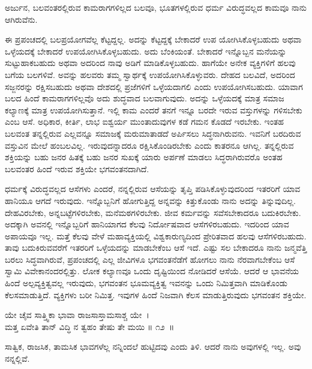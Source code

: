 \begin{artha}
ಅರ್ಜುನ, ಬಲವಂತರಲ್ಲಿರುವ ಕಾಮರಾಗಗಳಿಲ್ಲದ ಬಲವೂ, ಭೂತಗಳಲ್ಲಿರುವ ಧರ್ಮ ವಿರುದ್ಧ\-ವಲ್ಲದ ಕಾಮವೂ ನಾನು ಆಗಿರುವೆನು.
\end{artha}

ಈ ಪ್ರಪಂಚದಲ್ಲಿ ಬಲಪ್ರಯೋಗವೆಲ್ಲ ಕೆಟ್ಟದ್ದಲ್ಲ. ಅದನ್ನು ಕೆಟ್ಟದ್ದಕ್ಕೆ ಬೇಕಾದರೆ ಉಪ ಯೋಗಿಸಿಕೊಳ್ಳಬಹುದು ಅಥವಾ ಒಳ್ಳೆಯದಕ್ಕೆ ಬೇಕಾದರೆ ಉಪಯೋಗಿಸಿಕೊಳ್ಳಬಹುದು. ಅದು ಬೆಂಕಿಯಂತೆ. ಬೇಕಾದರೆ ಇನ್ನೊಬ್ಬನ ಮನೆಯನ್ನು ಸುಟ್ಟುಹಾಕಬಹುದು ಅಥವಾ ಅದರಿಂದ ನಾವು ಅಡಿಗೆ ಮಾಡಿಕೊಳ್ಳಬಹುದು. ಹಾಗೆಯೇ ಅನೇಕ ವ್ಯಕ್ತಿಗಳಿಗೆ ಹಲವು ಬಗೆಯ ಬಲಗಳಿವೆ. ಅವನ್ನು ಹಲವರು ತಮ್ಮ ಸ್ವಾರ್ಥಕ್ಕೆ ಉಪಯೋಗಿಸಿಕೊಳ್ಳುವರು. ದೇಹದ ಬಲವಿದೆ, ಅದರಿಂದ ಸಜ್ಜನರನ್ನು ರಕ್ಷಿಸಬಹುದು ಅಥವಾ ದೇಶದಲ್ಲಿ ಪ್ರಜೆಗಳಿಗೆ ಒಳ್ಳೆಯದಾಗಲಿ ಎಂದು ಉಪಯೋಗಿಸಬಹುದು. ಯಾವಾಗ ಬಲದ ಹಿಂದೆ ಕಾಮರಾಗಗಳಿಲ್ಲವೊ ಅದು ಶುದ್ಧವಾದ ಬಲವಾಗುವುದು. ಅದನ್ನು ಒಳ್ಳೆಯದಕ್ಕೆ ಮಾತ್ರ ಸಮಾಜ ಕಲ್ಯಾಣಕ್ಕೆ ಮಾತ್ರ ಉಪಯೋಗಿಸುತ್ತಾನೆ. ಇಲ್ಲಿ ಕಾಮ ಎಂದರೆ ತನಗೆ ಇನ್ನೂ ಬರದೇ ಇರುವ ವಸ್ತುಗಳನ್ನು ಗಳಿಸಬೇಕು ಎಂಬ ಆಸೆ. ಅಧಿಕಾರ, ಕೀರ್ತಿ, ಲಾಭ ಐಶ್ವರ್ಯ ಮುಂತಾದುವುಗಳ ಕಡೆ ಗಮನ ಕೊಡದೆ ಇರಬೇಕು. ಇಂತಹ ಬಲವಂತ ತನ್ನಲ್ಲಿರುವ ಎಲ್ಲವನ್ನೂ ಸಮಾಜಕ್ಕೆ ಮರುಮಾತಾಡದೆ ಅರ್ಪಿಸಲು ಸಿದ್ಧನಾಗಿರುವನು. ಇವನಿಗೆ ಬರದಿರುವ ವಸ್ತುವಿನ ಮೇಲೆ ಹಂಬಲವಿಲ್ಲ. ಇರುವುದನ್ನಾದರೂ ರಕ್ಷಿಸಿಕೊಂಡಿರಬೇಕು ಎಂದು ಕಾತರನೂ ಆಗಿಲ್ಲ. ತನ್ನಲ್ಲಿರುವ ಶಕ್ತಿಯನ್ನು ಬಹು ಜನರ ಹಿತಕ್ಕೆ ಬಹು ಜನರ ಸುಖಕ್ಕೆ ಯಾರು ಅರ್ಪಣೆ ಮಾಡಲು ಸಿದ್ಧರಾಗಿರುವರೊ ಅಂತಹ ಬಲವಂತರ ಹಿಂದೆ ಇರುವ ಶಕ್ತಿಯೇ ಭಗವಂತನದಾಗಿದೆ.

ಧರ್ಮಕ್ಕೆ ವಿರುದ್ಧವಲ್ಲದ ಆಸೆಗಳು ಎಂದರೆ, ನನ್ನಲ್ಲಿರುವ ಆಸೆಯನ್ನು ತೃಪ್ತಿ ಪಡಿಸಿಕೊಳ್ಳುವುದರಿಂದ ಇತರರಿಗೆ ಯಾವ ಹಾನಿಯೂ ಆಗದೆ ಇರುವುದು. ಇನ್ನೊಬ್ಬನಿಗೆ ಹೋಗುತ್ತಿದ್ದ ಅನ್ನವನ್ನು ಕಿತ್ತುಕೊಂಡು ನಾನು ಅದನ್ನು ತಿನ್ನುವುದಿಲ್ಲ. ದೇಹವಿರಬೇಕು, ಅನ್ನಬಟ್ಟೆಗಳಿರಬೇಕು, ಮನೆಮಠಗಳಿರಬೇಕು. ಜೀವ ಕರ್ಮವನ್ನು ಸವೆಸಬೇಕಾದರೂ ಬದುಕಿರಬೇಕು. ಅದಕ್ಕಾಗಿ ಅವನಲ್ಲಿ ಇನ್ನೊಬ್ಬರಿಗೆ ಹಾನಿಯಾಗದ ಕೆಲವು ನಿರ್ದೋಷವಾದ ಆಸೆಗಳಿರಬಹುದು. ಇದರಿಂದ ಯಾವ ಅಪಾಯವೂ ಇಲ್ಲ. ಮತ್ತೆ ಕೆಲವು ವೇಳೆ ಮಹಾವ್ಯಕ್ತಿಯಲ್ಲಿ ವಿಶ್ವಕಾರುಣ್ಯದಿಂದ ಪ್ರೇರಿತವಾದ ಹಲವು ಆಸೆಗಳಿರಬಹುದು. ತಾವು ಬದುಕಿರುವವರೆಗೆ ಇತರರಿಗೆ ಒಳ್ಳೆಯದನ್ನು ಮಾಡಬೇಕೆಂಬ ಆಸೆ ಇದೆ. ಎಷ್ಟು ಸಲ ಬೇಕಾದರೂ ನಾನು ಜನ್ಮವೆತ್ತಿ ಬರಲು ಸಿದ್ಧವಾಗಿರುವೆ, ಪ್ರಪಂಚದಲ್ಲಿ ಎಲ್ಲ ಜೀವಿಗಳೂ ಭಗವಂತನೆಡೆಗೆ ಹೋಗಲು ನಾನು ನೆರವಾಗಬೇಕೆಂಬ ಆಸೆ ಸ್ವಾಮಿ ವಿವೇಕಾನಂದರಲ್ಲಿತ್ತು. ಲೋಕ ಕಲ್ಯಾಣವೂ ಒಂದು ದೃಷ್ಟಿಯಿಂದ ನೋಡಿದರೆ ಆಸೆಯೆ. ಆದರೆ ಆ ಭಾವನೆಯ ಹಿಂದೆ ಅಲ್ಪವ್ಯಕ್ತಿತ್ವವಲ್ಲ ಇರುವುದು, ಭಗವಂತನ ಭೂಮವ್ಯಕ್ತಿತ್ವ ಇವನನ್ನು ಒಂದು ನಿಮಿತ್ತವಾಗಿ ಮಾಡಿಕೊಂಡು ಕೆಲಸಮಾಡುತ್ತಿದೆ. ವ್ಯಕ್ತಿಗಳು ಬರೀ ನಿಮಿತ್ತ. ಇವುಗಳ ಹಿಂದೆ ನಿಜವಾಗಿ ಕೆಲಸ ಮಾಡುತ್ತಿರುವುದು ಭಗವಂತನ ಶಕ್ತಿಯೇ.

\begin{shloka}
ಯೇ ಚೈವ ಸಾತ್ತ್ವಿಕಾ ಭಾವಾ ರಾಜಸಾಸ್ತಾಮಸಾಶ್ಚ ಯೇ~।\\ಮತ್ತ ಏವೇತಿ ತಾನ್ ವಿದ್ಧಿ ನ ತ್ವಹಂ ತೇಷು ತೇ ಮಯಿ \hfill॥ ೧೨~॥
\end{shloka}

\begin{artha}
ಸಾತ್ವಿಕ, ರಾಜಸಿಕ, ತಾಮಸಿಕ ಭಾವಗಳೆಲ್ಲ ನನ್ನಿಂದಲೆ ಹುಟ್ಟಿದವು ಎಂದು ತಿಳಿ. ಆದರೆ ನಾನು ಅವುಗಳಲ್ಲಿ ಇಲ್ಲ. ಅವು ನನ್ನಲ್ಲಿವೆ.
\end{artha}

